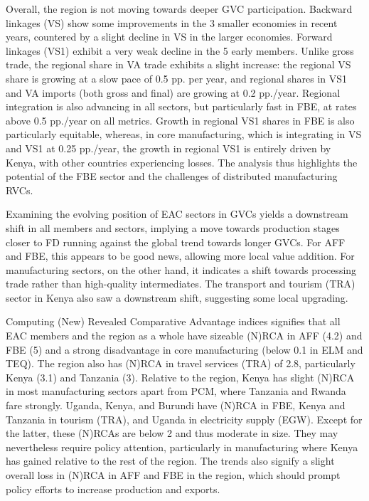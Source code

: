 \documentclass[a4paper]{article}
\begin{document}
Overall, the region is not moving towards deeper GVC participation. Backward linkages (VS) show some improvements in the 3 smaller economies in recent years, countered by a slight decline in VS in the larger economies. Forward linkages (VS1) exhibit a very weak decline in the 5 early members. Unlike gross trade, the regional share in VA trade exhibits a slight increase: the regional VS share is growing at a slow pace of 0.5 pp. per year, and regional shares in VS1 and VA imports (both gross and final) are growing at 0.2 pp./year. Regional integration is also advancing in all sectors, but particularly fast in FBE, at rates above 0.5 pp./year on all metrics. Growth in regional VS1 shares in FBE is also particularly equitable, whereas, in core manufacturing, which is integrating in VS and VS1 at 0.25 pp./year, the growth in regional VS1 is entirely driven by Kenya, with other countries experiencing losses. The analysis thus highlights the potential of the FBE sector and the challenges of distributed manufacturing RVCs. \newline

Examining the evolving position of EAC sectors in GVCs yields a downstream shift in all members and sectors, implying a move towards production stages closer to FD running against the global trend towards longer GVCs. For AFF and FBE, this appears to be good news, allowing more local value addition. For manufacturing sectors, on the other hand, it indicates a shift towards processing trade rather than high-quality intermediates. The transport and tourism (TRA) sector in Kenya also saw a downstream shift, suggesting some local upgrading. \newline

Computing (New) Revealed Comparative Advantage indices signifies that all EAC members and the region as a whole have sizeable (N)RCA in AFF (4.2) and FBE (5) and a strong disadvantage in core manufacturing (below 0.1 in ELM and TEQ). The region also has (N)RCA in travel services (TRA) of 2.8, particularly Kenya (3.1) and Tanzania (3). Relative to the region, Kenya has slight (N)RCA in most manufacturing sectors apart from PCM, where Tanzania and Rwanda fare strongly. Uganda, Kenya, and Burundi have (N)RCA in FBE, Kenya and Tanzania in tourism (TRA), and Uganda in electricity supply (EGW). Except for the latter, these (N)RCAs are below 2 and thus moderate in size. They may nevertheless require policy attention, particularly in manufacturing where Kenya has gained relative to the rest of the region. The trends also signify a slight overall loss in (N)RCA in AFF and FBE in the region, which should prompt policy efforts to increase production and exports. \newline
\end{document}
